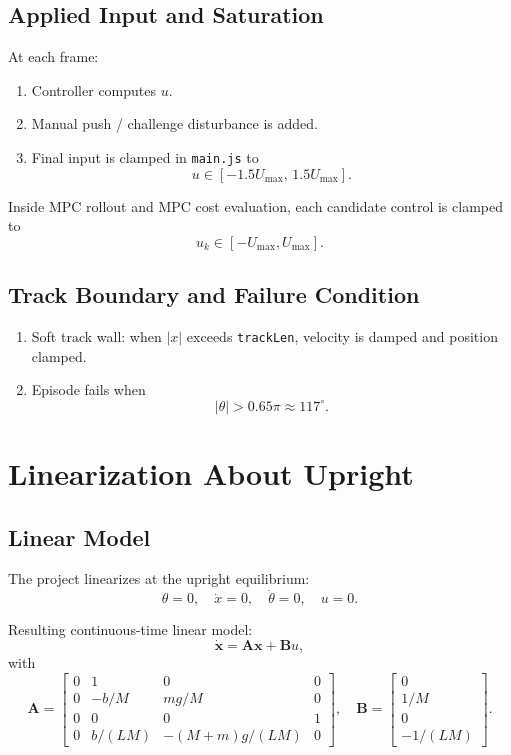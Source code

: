 \documentclass[11pt,a4paper]{article}
\newcommand{\state}{\mathbf{x}}
\newcommand{\A}{\mathbf{A}}
\newcommand{\B}{\mathbf{B}}
\begin{document}
\subsection{Applied Input and Saturation}
At each frame:
\begin{enumerate}[label=\arabic*.]
  \item Controller computes $u$.
  \item Manual push / challenge disturbance is added.
  \item Final input is clamped in \texttt{main.js} to
  \begin{equation}
  u \in [-1.5U_{\max},\,1.5U_{\max}].
  \end{equation}
\end{enumerate}

Inside MPC rollout and MPC cost evaluation, each candidate control is clamped to
\begin{equation}
u_k \in [-U_{\max},U_{\max}].
\end{equation}

\subsection{Track Boundary and Failure Condition}
\begin{enumerate}[label=\arabic*.]
  \item Soft track wall: when $|x|$ exceeds \texttt{trackLen}, velocity is damped and position clamped.
  \item Episode fails when
  \begin{equation}
  |\theta| > 0.65\pi \approx 117^\circ.
  \end{equation}
\end{enumerate}

\section{Linearization About Upright}
\subsection{Linear Model}
The project linearizes at the upright equilibrium:
\begin{equation}
\theta=0,\quad \dot{x}=0,\quad \dot{\theta}=0,\quad u=0.
\end{equation}

Resulting continuous-time linear model:
\begin{equation}
\dot{\state} = \A \state + \B u,
\end{equation}
with
\begin{equation}
\A =
\begin{bmatrix}
0 & 1 & 0 & 0 \\
0 & -b/M & mg/M & 0 \\
0 & 0 & 0 & 1 \\
0 & b/(LM) & -(M+m)g/(LM) & 0
\end{bmatrix},
\quad
\B =
\begin{bmatrix}
0 \\ 1/M \\ 0 \\ -1/(LM)
\end{bmatrix}.
\end{equation}
\end{document}
